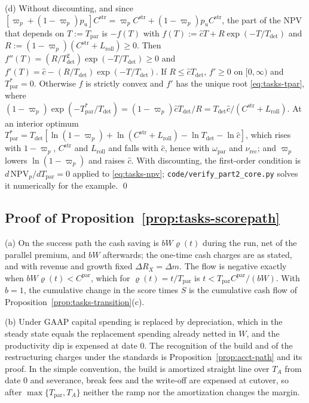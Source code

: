 (d) Without discounting, and since $[\varpi_p+(1-\varpi_p)p_u]C^{\mathrm{str}}=\varpi_pC^{\mathrm{str}}+(1-\varpi_p)p_uC^{\mathrm{str}}$, the part of the NPV that depends on $T:=T_{\mathrm{par}}$ is $-f(T)$ with $f(T):=\hat cT+R\exp(-T/T_{\mathrm{det}})$ and $R:=(1-\varpi_p)(C^{\mathrm{str}}+L_{\mathrm{roll}})\ge 0$. Then $f''(T)=(R/T_{\mathrm{det}}^2)\exp(-T/T_{\mathrm{det}})\ge 0$ and $f'(T)=\hat c-(R/T_{\mathrm{det}})\exp(-T/T_{\mathrm{det}})$. If $R\le\hat cT_{\mathrm{det}}$, $f'\ge 0$ on $[0,\infty)$ and $T^*_{\mathrm{par}}=0$. Otherwise $f$ is strictly convex and $f'$ has the unique root \eqref{eq:tasks-tpar}, where $(1-\varpi_p)\exp(-T^*_{\mathrm{par}}/T_{\mathrm{det}})=(1-\varpi_p)\hat cT_{\mathrm{det}}/R=T_{\mathrm{det}}\hat c/(C^{\mathrm{str}}+L_{\mathrm{roll}})$. At an interior optimum $T^*_{\mathrm{par}}=T_{\mathrm{det}}[\ln(1-\varpi_p)+\ln(C^{\mathrm{str}}+L_{\mathrm{roll}})-\ln T_{\mathrm{det}}-\ln\hat c]$, which rises with $1-\varpi_p$, $C^{\mathrm{str}}$ and $L_{\mathrm{roll}}$ and falls with $\hat c$, hence with $\omega_{\mathrm{par}}$ and $\nu_{\mathrm{rec}}$; and $\varpi_p$ lowers $\ln(1-\varpi_p)$ and raises $\hat c$. With discounting, the first-order condition is $d\,\mathrm{NPV}_p/dT_{\mathrm{par}}=0$ applied to \eqref{eq:tasks-npv}; \texttt{code/verify\_part2\_core.py} solves it numerically for the example. \qed

\subsection*{Proof of Proposition~\ref{prop:tasks-scorepath}}

(a) On the success path the cash saving is $bW\varrho(t)$ during the run, net of the parallel premium, and $bW$ afterwards; the one-time cash charges are as stated, and with revenue and growth fixed $\Delta R_X=\Delta m$. The flow is negative exactly when $bW\varrho(t)<C^{\mathrm{par}}$, which for $\varrho(t)=t/T_{\mathrm{par}}$ is $t<T_{\mathrm{par}}C^{\mathrm{par}}/(bW)$. With $b=1$, the cumulative change in the score times $S$ is the cumulative cash flow of Proposition~\ref{prop:tasks-transition}(c).

(b) Under GAAP capital spending is replaced by depreciation, which in the steady state equals the replacement spending already netted in $W$, and the productivity dip is expensed at date 0. The recognition of the build and of the restructuring charges under the standards is Proposition~\ref{prop:acct-path} and its proof. In the simple convention, the build is amortized straight line over $T_A$ from date 0 and severance, break fees and the write-off are expensed at cutover, so after $\max\{T_{\mathrm{par}},T_A\}$ neither the ramp nor the amortization changes the margin.

